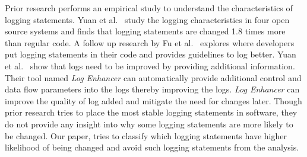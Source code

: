 Prior research performs an empirical study to understand the characteristics of logging statements. Yuan et al.~\cite{Characterizinglogs} study the logging characteristics in four open source systems and finds that logging statements are changed 1.8 times more than regular code. A follow up research by Fu {et al$.$}~\cite{Fu1} explores where developers put logging statements in their code and provides guidelines to log better. Yuan {et al$ . $}~\cite{Yuan} show that logs need to be improved by providing additional information. Their tool named \emph{Log Enhancer} can automatically provide additional control and data flow parameters into the logs thereby improving the logs. \emph{Log Enhancer} can improve the quality of log added and mitigate the need for changes later. Though prior research tries to place the most stable logging statements in software, they do not provide any insight into why some logging statements are more likely to be changed. Our paper, tries to classify which logging statements have higher likelihood of being changed and avoid such logging statements from the analysis.









